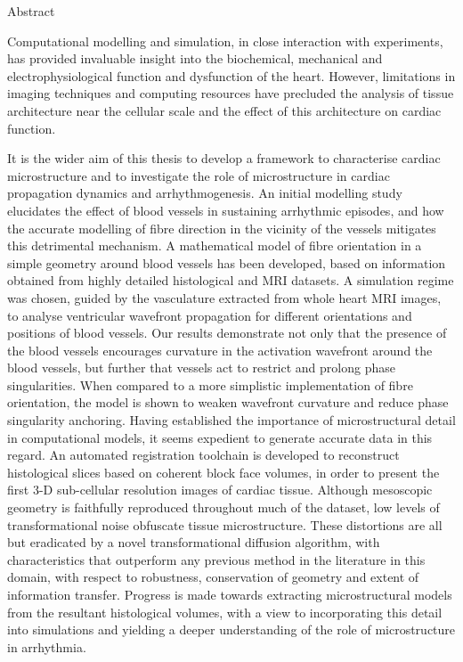 {
\Large
\noindent\makebox[3in][l]{\xauthor}\hfill{} \vskip 1pt
\makebox[3in][l]{\xcollege}\hfill\makebox[3in][r]{\xterm}
}

\vskip 1cm

{
\LARGE \bf
\begin{center}
{\xtitle}
\end{center}
}

{
\large\bf
\begin{center}
Abstract
\end{center}
}

\setlength{\baselineskip}{16truept}
Computational modelling and simulation, in close interaction with experiments, has provided invaluable insight into the biochemical, mechanical and electrophysiological function and dysfunction of the heart. However, limitations in imaging techniques and computing resources have precluded the analysis of tissue architecture near the cellular scale and the effect of this architecture on cardiac function.

It is the wider aim of this thesis to develop a framework to characterise cardiac microstructure and to investigate the role of microstructure in cardiac propagation dynamics and arrhythmogenesis. An initial modelling study elucidates the effect of blood vessels in sustaining arrhythmic episodes, and how the accurate modelling of fibre direction in the vicinity of the vessels mitigates this detrimental mechanism. A mathematical model of fibre orientation in a simple geometry around blood vessels has been developed, based on information obtained from highly detailed histological and MRI datasets. A simulation regime was chosen, guided by the vasculature extracted from whole heart MRI images, to analyse ventricular wavefront propagation for different orientations and positions of blood vessels. Our results demonstrate not only that the presence of the blood vessels encourages curvature in the activation wavefront around the blood vessels, but further that vessels act to restrict and prolong phase singularities. When compared to a more simplistic implementation of fibre orientation, the model is shown to weaken wavefront curvature and reduce phase singularity anchoring. Having established the importance of microstructural detail in computational models, it seems expedient to generate accurate data in this regard. An automated registration toolchain is developed to reconstruct histological slices based on coherent block face volumes, in order to present the first 3-D sub-cellular resolution images of cardiac tissue. Although mesoscopic geometry is faithfully reproduced throughout much of the dataset, low levels of transformational noise obfuscate tissue microstructure. These distortions are all but eradicated by a novel transformational diffusion algorithm, with characteristics that outperform any previous method in the literature in this domain, with respect to robustness, conservation of geometry and extent of information transfer. Progress is made towards extracting microstructural models from the resultant histological volumes, with a view to incorporating this detail into simulations and yielding a deeper understanding of the role of microstructure in arrhythmia.
